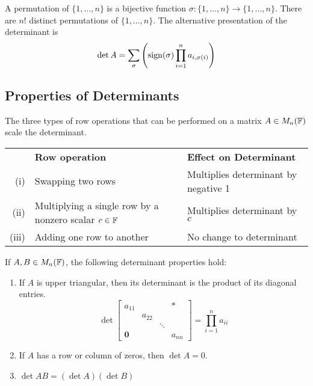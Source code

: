 \begin{definition}
A permutation of $\{1, \dots, n\}$ is a bijective function $\sigma: \{1, \dots, n\} \rightarrow \{1, \dots, n\}$. There are $n!$ distinct permutations of $\{1, \dots, n\}$. The alternative presentation of the determinant is
$$
\det A = \sum_{\sigma}
\left( \operatorname{sign}(\sigma) \prod_{i=1}^n a_{i, \sigma(i)} \right)
$$
\end{definition}

\subsection{Properties of Determinants}
\label{subsection:properties-of-determinants}
The three types of row operations that can be performed on a matrix $A \in M_n(\mathbb F)$ scale the determinant.

\begin{center}
    \begin{tabular}{r l l}
    & \textbf{Row operation} & \textbf{Effect on Determinant}\\
    (i) & Swapping two rows & Multiplies determinant by negative 1 \\
    (ii) &  Multiplying a single row by a nonzero scalar $c \in \mathbb F$ &  Multiplies determinant by $c$ \\
    (iii) & Adding one row to another & No change to determinant
    \end{tabular}
\end{center}

\begin{proposition}
\label{prop:determinant-basics}
If $A, B \in M_n(\mathbb F)$, the following determinant properties hold:
\begin{enumerate}
    \item If $A$ is upper triangular, then its determinant is the product of its diagonal entries.
    $$\det \begin{bmatrix} a_{11} &  &  & * \\ 
                           & a_{22} &  & \\ 
                           &  & \ddots & \\
                           \mathbf{0} &  &  & a_{nn}
            \end{bmatrix} = \prod_{i=1}^n a_{ii}$$
    \item If $A$ has a row or column of zeros, then $\det A = 0$.
    \item $\det AB = (\det A)(\det B)$
\end{enumerate}
\end{proposition}

